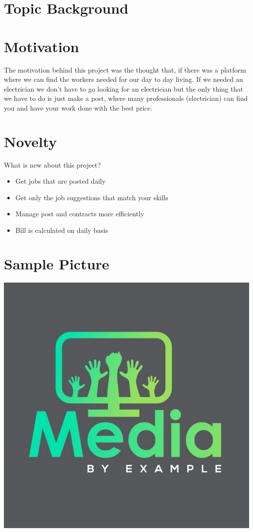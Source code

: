 
\section{Topic Background}


\section{Motivation}
The motivation behind this project was the thought that, if there was a platform where we can find the workers needed for our day to day living. If we needed an electrician we don't have to go looking for an electrician but the only thing that we have to do is just make a post, where many professionals (electrician) can find you and have your work done with the best price.
\clearpage

\section{Novelty}

What is new about this project?

\begin{itemize}
\item Get jobs that are posted daily
\item Get only the job suggestions that match your skills
\item Manage post and contracts more efficiently
\item Bill is calculated on daily basis
\end{itemize}

\clearpage

\section{Sample Picture}
\includegraphics[scale=0.5]{Untitled+design+(2).png}

